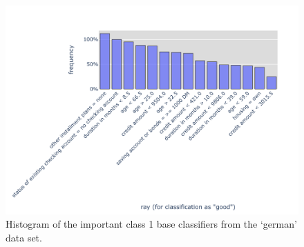 \begin{figure}[H]
    \centering
    \includegraphics[width=0.9\columnwidth]{figures/german/raysClass1Histogram.pdf}
    \caption{Histogram of the important class 1 base classifiers from the `german' data set.}\label{fig:histGermanR1}
\end{figure}


